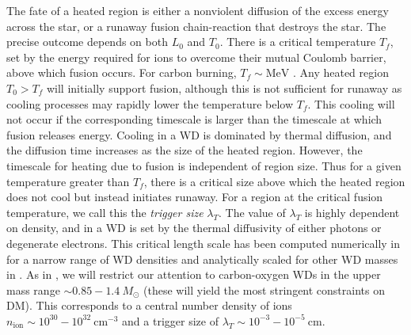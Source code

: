 \documentclass[preprintnumbers,amsmath,amssymb,prd, superscriptaddress,twocolumn]{revtex4}
\newcommand{\MeV}{\text{MeV}}
\newcommand{\cm}{\text{cm}}
\begin{document}
The fate of a heated region is either a nonviolent diffusion of the excess energy across the star, or a runaway fusion chain-reaction that destroys the star.
The precise outcome depends on both $L_0$ and $T_0$.
There is a critical temperature $T_f$, set by the energy required for ions to overcome their mutual Coulomb barrier, above which fusion occurs.
For carbon burning, $T_f \sim \MeV$ \cite{Gasques:2005ar}.
Any heated region $T_0 > T_f$ will initially support fusion, although this is not sufficient for runaway as cooling processes may rapidly lower the temperature below $T_f$.
This cooling will not occur if the corresponding timescale is larger than the timescale at which fusion releases energy.
Cooling in a WD is dominated by thermal diffusion, and the diffusion time increases as the size of the heated region.
However, the timescale for heating due to fusion is independent of region size.
Thus for a given temperature greater than $T_f$, there is a critical size above which the heated region does not cool but instead initiates runaway.
For a region at the critical fusion temperature, we call this the \emph{trigger size} $\lambda_T$.
The value of $\lambda_T$ is highly dependent on density, and in a WD is set by the thermal diffusivity of either photons or degenerate electrons.
This critical length scale has been computed numerically in \cite{Woosley} for a narrow range of WD densities and analytically scaled for other WD masses in \cite{Graham:2015apa}.
As in \cite{Graham:2015apa}, we will restrict our attention to carbon-oxygen WDs in the upper mass range $\sim 0.85 - 1.4 ~M_{\odot}$ (these will yield the most stringent constraints on DM).
This corresponds to a central number density of ions $n_\text{ion} \sim 10^{30} - 10^{32} ~\cm^{-3}$ and a trigger size of $\lambda_T \sim 10^{-3} - 10^{-5} ~\text{cm}$.
\end{document}
